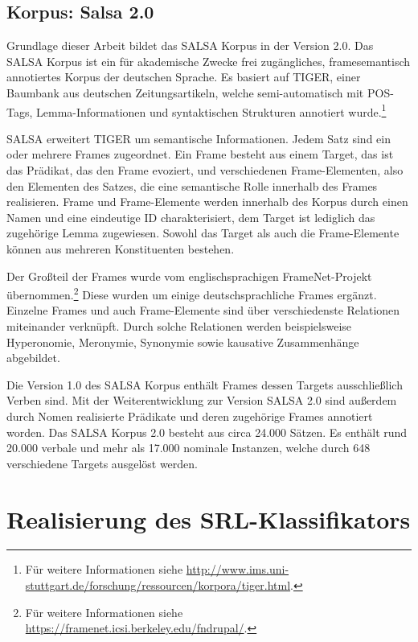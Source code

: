 \documentclass[12pt]{article}
\begin{document}
\subsection{Korpus: Salsa 2.0}

Grundlage dieser Arbeit bildet das SALSA Korpus in der Version 2.0. Das SALSA Korpus ist ein für akademische Zwecke frei zugängliches, framesemantisch annotiertes Korpus der deutschen Sprache. Es basiert auf TIGER\citep{brants_tiger_2002, tiger}, einer Baumbank aus deutschen Zeitungsartikeln, welche semi-automatisch mit POS-Tags, Lemma-Informationen und syntaktischen Strukturen annotiert wurde.\footnote{Für weitere Informationen siehe \url{http://www.ims.uni-stuttgart.de/forschung/ressourcen/korpora/tiger.html}.}

SALSA erweitert TIGER um semantische Informationen. Jedem Satz sind ein oder mehrere Frames zugeordnet. Ein Frame besteht aus einem Target, das ist das Prädikat, das den Frame evoziert, und verschiedenen Frame-Elementen, also den Elementen des Satzes, die eine semantische Rolle innerhalb des Frames realisieren. Frame und Frame-Elemente werden innerhalb des Korpus durch einen Namen und eine eindeutige ID charakterisiert, dem Target ist lediglich das zugehörige Lemma zugewiesen. Sowohl das Target als auch die Frame-Elemente können aus mehreren Konstituenten bestehen.

Der Großteil der Frames wurde vom englischsprachigen FrameNet-Projekt\citep{baker_berkeley_1998} übernommen.\footnote{Für weitere Informationen siehe \url{https://framenet.icsi.berkeley.edu/fndrupal/}.} Diese wurden um einige deutschsprachliche Frames ergänzt. Einzelne Frames und auch Frame-Elemente sind über verschiedenste Relationen miteinander verknüpft. Durch solche Relationen werden beispielsweise Hyperonomie, Meronymie, Synonymie sowie kausative Zusammenhänge abgebildet.

Die Version 1.0 des SALSA Korpus\citep{burchardt_salsa_2006} enthält Frames dessen Targets ausschließlich Verben sind. Mit der Weiterentwicklung zur Version SALSA 2.0\citep{rehbein_adding_2012} sind außerdem durch Nomen realisierte Prädikate und deren zugehörige Frames annotiert worden. Das SALSA Korpus 2.0 besteht aus circa 24.000 Sätzen. Es enthält rund 20.000 verbale und mehr als 17.000 nominale Instanzen, welche durch 648 verschiedene Targets ausgelöst werden.

\section{Realisierung des SRL-Klassifikators}
\end{document}
